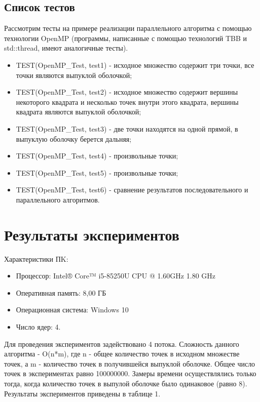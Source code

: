 \documentclass{report}
\begin{document}
\subsection{Список тестов}
Рассмотрим тесты на примере реализации параллельного алгоритма с помощью технологии OpenMP (программы, написанные с помощью технологий TBB и std::thread, имеют аналогичные тесты).
\begin{itemize}
\item TEST(OpenMP\_Test, test1) - исходное множество содержит три точки, все точки являются выпуклой оболочкой;
\item TEST(OpenMP\_Test, test2) - исходное множество содержит вершины некоторого квадрата и несколько точек внутри этого квадрата, вершины квадрата являются выпуклой оболочкой;
\item TEST(OpenMP\_Test, test3) - две точки находятся на одной прямой, в выпуклую оболочку берется дальняя;
\item TEST(OpenMP\_Test, test4) - произвольные точки;
\item TEST(OpenMP\_Test, test5) - произвольные точки;
\item TEST(OpenMP\_Test, test6) - сравнение результатов последовательного и параллельного алгоритмов.
\end{itemize}

\newpage

\section{Результаты экспериментов}

Характеристики ПK:

\begin{itemize}
\item Процессор: Intel® Core™ i5-85250U CPU @ 1.60GHz 1.80 GHz
\item Оперативная память: 8,00 ГБ
\item Операционная система: Windows 10
\item Число ядер: 4.
\end{itemize}


\par Для проведения экспериментов задействовано 4 потока. Сложность данного алгоритма - O(n*m), где n - общее количество точек в исходном множестве точек, а m - количество точек в получившейся выпуклой оболочке. Общее число точек в экспериментах равно 100000000. Замеры времени осуществлялись только тогда, когда количество точек в выпулой оболочке было одинаковое (равно 8). Результаты экспериментов приведены в таблице 1.
\end{document}
